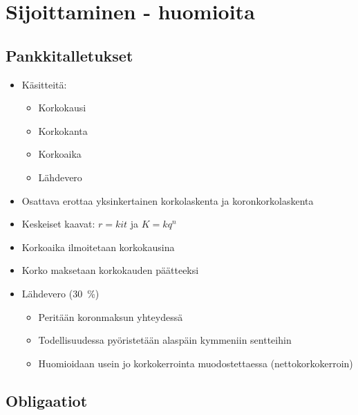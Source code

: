\documentclass{article}
\begin{document}
\section{Sijoittaminen - huomioita}\label{sijoittaminen---huomioita}

\subsection{Pankkitalletukset}\label{pankkitalletukset}

\begin{itemize}
\itemsep1pt\parskip0pt
\item
  Käsitteitä:

  \begin{itemize}
  \itemsep1pt\parskip0pt
  \item
    Korkokausi
  \item
    Korkokanta
  \item
    Korkoaika
  \item
    Lähdevero
  \end{itemize}
\item 
  Osattava erottaa yksinkertainen korkolaskenta ja koronkorkolaskenta 
\item 
  Keskeiset kaavat: \(r=kit\) ja \(K = kq^n\)
\item
  Korkoaika ilmoitetaan korkokausina
\item
  Korko maksetaan korkokauden päätteeksi
\item
  Lähdevero (30~\%)
  \begin{itemize}
    \item 
      Peritään koronmaksun yhteydessä 
    \item
      Todellisuudessa pyöristetään alaspäin kymmeniin sentteihin 
    \item
      Huomioidaan usein jo korkokerrointa muodostettaessa (nettokorkokerroin)
  \end{itemize}
\end{itemize}

\subsection{Obligaatiot}\label{obligaatiot}
\end{document}
